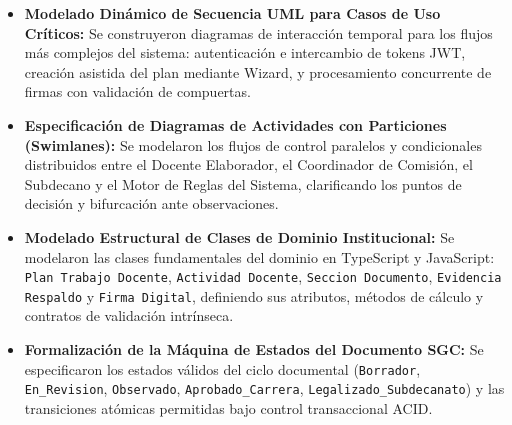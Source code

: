 \documentclass[12pt,a4paper]{article}
\begin{document}
\begin{itemize}[leftmargin=1.5em, itemsep=4pt]
    \item \textbf{Modelado Dinámico de Secuencia UML para Casos de Uso Críticos:} Se construyeron diagramas de interacción temporal para los flujos más complejos del sistema: autenticación e intercambio de tokens JWT, creación asistida del plan mediante Wizard, y procesamiento concurrente de firmas con validación de compuertas.
    \item \textbf{Especificación de Diagramas de Actividades con Particiones (Swimlanes):} Se modelaron los flujos de control paralelos y condicionales distribuidos entre el Docente Elaborador, el Coordinador de Comisión, el Subdecano y el Motor de Reglas del Sistema, clarificando los puntos de decisión y bifurcación ante observaciones.
    \item \textbf{Modelado Estructural de Clases de Dominio Institucional:} Se modelaron las clases fundamentales del dominio en TypeScript y JavaScript: \texttt{Plan Trabajo Docente}, \texttt{Actividad Docente}, \texttt{Seccion Documento}, \texttt{Evidencia Respaldo} y \texttt{Firma Digital}, definiendo sus atributos, métodos de cálculo y contratos de validación intrínseca.
    \item \textbf{Formalización de la Máquina de Estados del Documento SGC:} Se especificaron los estados válidos del ciclo documental (\texttt{Borrador}, \texttt{En\_\allowbreak  Revision}, \texttt{Observado}, \texttt{Aprobado\_\allowbreak   Carrera}, \texttt{Legalizado\_\allowbreak   Subdecanato}) y las transiciones atómicas permitidas bajo control transaccional ACID.
\end{itemize}
\end{document}
